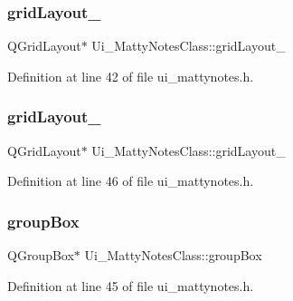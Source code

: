\hypertarget{classUi__MattyNotesClass_a568e0fe1cd6a4711a9e881b8855ad15a}{}\label{classUi__MattyNotesClass_a568e0fe1cd6a4711a9e881b8855ad15a} 
\subsubsection{\texorpdfstring{grid\+Layout\+\_}{gridLayout\_2}}
{\footnotesize\ttfamily Q\+Grid\+Layout$\ast$ Ui\+\_\+\+Matty\+Notes\+Class\+::grid\+Layout\+\_}



Definition at line 42 of file ui\+\_\+mattynotes.\+h.

\hypertarget{classUi__MattyNotesClass_a3fb284446d42efd061111a37e6806637}{}\label{classUi__MattyNotesClass_a3fb284446d42efd061111a37e6806637} 
\subsubsection{\texorpdfstring{grid\+Layout\+\_}{gridLayout\_3}}
{\footnotesize\ttfamily Q\+Grid\+Layout$\ast$ Ui\+\_\+\+Matty\+Notes\+Class\+::grid\+Layout\+\_}



Definition at line 46 of file ui\+\_\+mattynotes.\+h.

\hypertarget{classUi__MattyNotesClass_a658cd965413e1623c38cda605681e4f7}{}\label{classUi__MattyNotesClass_a658cd965413e1623c38cda605681e4f7} 
\subsubsection{\texorpdfstring{group\+Box}{groupBox}}
{\footnotesize\ttfamily Q\+Group\+Box$\ast$ Ui\+\_\+\+Matty\+Notes\+Class\+::group\+Box}



Definition at line 45 of file ui\+\_\+mattynotes.\+h.

\hypertarget{classUi__MattyNotesClass_a6681d3ce8f04c81a339e747865079634}{}\label{classUi__MattyNotesClass_a6681d3ce8f04c81a339e747865079634} 
